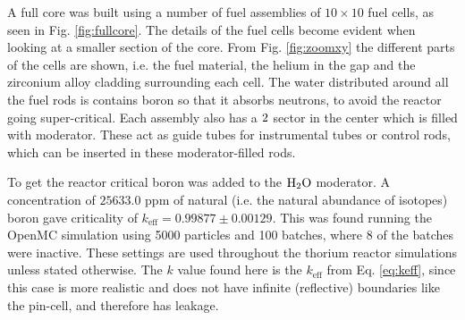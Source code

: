 \documentclass[norsk,a4paper,12pt]{article}
\begin{document}
\begin{multicols}{2}

A full core was built using a number of fuel assemblies of $10 \times 10$ fuel cells, as seen in Fig. \ref{fig:fullcore}. The details of the fuel cells become evident when looking at a smaller section of the core. From Fig. \ref{fig:zoomxy} the different parts of the cells are shown, i.e. the fuel material, the helium in the gap and the zirconium alloy cladding surrounding each cell. The water distributed around all the fuel rods is contains boron so that it absorbs neutrons, to avoid the reactor going super-critical. Each assembly also has a $2 \time 2$ sector in the center which is filled with moderator. These act as guide tubes for instrumental tubes or control rods, which can be inserted in these moderator-filled rods.




To get the reactor critical boron was added to the $\ce{H_{2}O}$ moderator. A concentration of $25633.0$ ppm of natural (i.e. the natural abundance of isotopes) boron gave criticality of $k_{\text{eff}} = 0.99877 \pm 0.00129$. This was found running the OpenMC simulation using 5000 particles and 100 batches, where 8 of the batches were inactive. These settings are used throughout the thorium reactor simulations unless stated otherwise. The $k$ value found here is the $k_{\text{eff}}$ from Eq. \ref{eq:keff}, since this case is more realistic and does not have infinite (reflective) boundaries like the pin-cell, and therefore has leakage.


\end{multicols}
\end{document}
